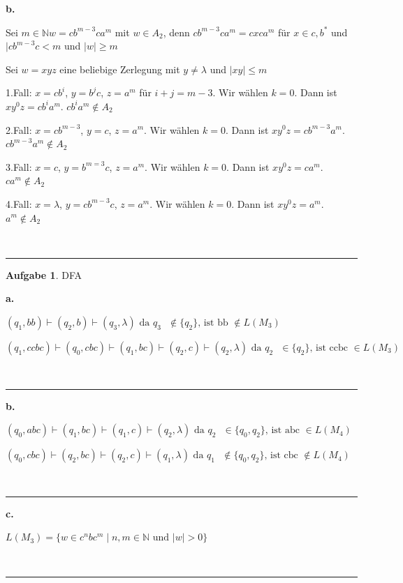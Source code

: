 \documentclass[10pt,leqno ]{article}
\theoremstyle{definition}
\newtheorem{problem}[theorem]{Aufgabe}
\newenvironment{solution}[1][L]{\begin{doublespace}\textbf{#1.}\quad }{\ \rule{0.5em}{0.5em}\end{doublespace}}
\begin{document}
\begin{solution}[b]

    Sei $m \in \mathbb{N} w = cb^{m-3}ca^{m}$ mit $w \in A_2$, denn $cb^{m-3}ca^{m} = cxca^{m}$ für $x \in {c,b}^{*}$ und $ |cb^{m-3}c < m$ und $|w| \geq m$

    Sei $w=xyz$ eine beliebige Zerlegung mit $y \neq \lambda$ und $|xy| \leq m $

    1.Fall: $x=cb^{i}$, $y=b^{j}c$, $z=a^{m}$ für $i+j = m-3$. Wir wählen $k=0$. Dann ist $xy^{0}z = cb^{i}a^{m}$. $cb^{i}a^{m}\notin A_2$ 

    2.Fall: $x=cb^{m-3}$, $y=c$, $z=a^{m}$. Wir wählen $k=0$. Dann ist $xy^{0}z = cb^{m-3}a^{m}$. $cb^{m-3}a^{m} \notin A_2$ 

    3.Fall: $x=c$, $y=b^{m=3}c$, $z=a^{m}$. Wir wählen $k=0$. Dann ist $xy^{0}z = ca^{m}$. $ca^{m} \notin A_2$ 

    4.Fall: $x=\lambda$, $y=cb^{m-3}c$, $z=a^{m}$. Wir wählen $k=0$. Dann ist $xy^{0}z = a^{m}$. $a^{m} \notin A_2$ 
    
\end{solution}



\begin{problem}
    DFA
\end{problem}

\begin{solution}[a]

    \( (q_1,bb) \vdash (q_2,b) \vdash (q_3,\lambda) \text{ da $q_3$ $\notin \{ q_2 \}$, ist bb $\notin L(M_3)$  } \) 

    \( (q_1,ccbc) \vdash (q_0,cbc) \vdash (q_1,bc) \vdash (q_2,c) \vdash (q_2,\lambda) \text{ da $q_2$ $\in \{ q_2 \}$, ist ccbc $\in L(M_3)$  } \)
    
\end{solution}

\begin{solution}[b]
    
    \( (q_0,abc) \vdash (q_1,bc) \vdash (q_1,c) \vdash (q_2,\lambda) \text{ da $q_2$ $\in \{ q_0,q_2 \}$, ist abc $\in L(M_4)$} \)

    \( (q_0,cbc) \vdash (q_2,bc) \vdash (q_2,c) \vdash (q_1,\lambda) \text{ da $q_1$ $\notin \{ q_0,q_2 \}$, ist cbc $\notin L(M_4)$ }\)
    
\end{solution}

\begin{solution}[c]

    \( L(M_3) = \{ w \in c^{n}bc^{m} \mid n,m \in \mathbb{N} \text{ und } |w| > 0 \} \)
    
\end{solution}
\end{document}
